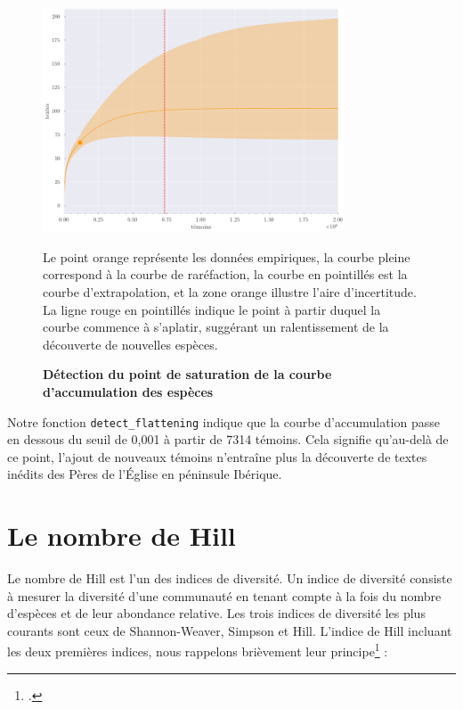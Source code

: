 \documentclass[a4paper,twoside,12pt]{book}
\begin{document}
\begin{figure}[H]
	\centering
	\includegraphics[width=0.8\textwidth]{img/applatissement.png}
	\caption{\textbf{Détection du point de saturation de la courbe d'accumulation des espèces }}
	 Le point orange représente les données empiriques, la courbe pleine correspond à la courbe de raréfaction, la courbe en pointillés est la courbe d’extrapolation, et la zone orange illustre l’aire d’incertitude. La ligne rouge en pointillés indique le point à partir duquel la courbe commence à s’aplatir, suggérant un ralentissement de la découverte de nouvelles espèces.
	 
	\label{fig:ton_label}
\end{figure}

Notre fonction \texttt{detect\_flattening} indique que la courbe d'accumulation passe en dessous du seuil de 0{,}001 à partir de 7314 témoins. Cela signifie qu’au-delà de ce point, l’ajout de nouveaux témoins n’entraîne plus la découverte de textes inédits des Pères de l’Église en péninsule Ibérique.


\section{Le nombre de Hill}

Le nombre de Hill est l'un des indices de diversité. Un indice de diversité consiste à mesurer la diversité d'une communauté en tenant compte à la fois du nombre d'espèces et de leur abondance relative. Les trois indices de diversité les plus courants sont ceux de Shannon-Weaver, Simpson et Hill. L'indice de Hill incluant les deux premières indices, nous rappelons brièvement leur principe\footcite[Pour les définitions des indices de diversité, nous nous sommes appuyés sur le cours d'Eric Marcon, chercheur en écologie tropicale à l’UMR Amap et enseignant à AgroParisTech. Le cours est disponible sur : ][chapitre Entropie]{MarconMesuresBioDiv2} :
\end{document}
